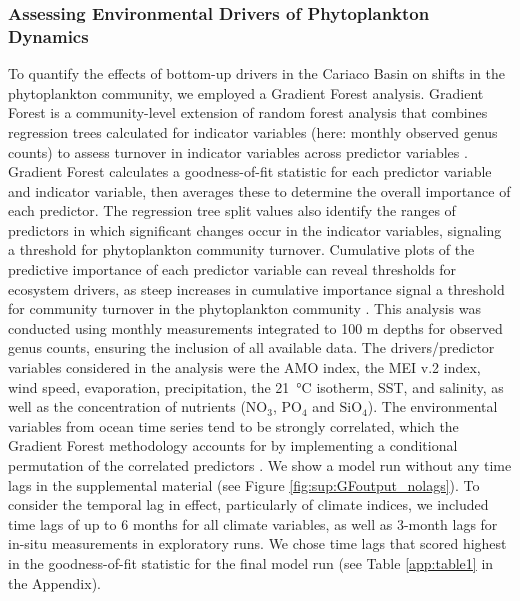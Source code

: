 \documentclass[draft]{agujournal2019}
\begin{document}
    \subsubsection{Assessing Environmental Drivers of Phytoplankton Dynamics}
    To quantify the effects of bottom-up drivers in the Cariaco Basin on shifts in the phytoplankton community, we employed a Gradient Forest analysis. Gradient Forest is a community-level extension of random forest analysis that combines regression trees calculated for indicator variables (here: monthly observed genus counts) to assess turnover in indicator variables across predictor variables \cite{pitcher_example_2012, large_critical_2015, tam_comparing_2017}. Gradient Forest calculates a goodness-of-fit statistic for each predictor variable and indicator variable, then averages these to determine the overall importance of each predictor. The regression tree split values also identify the ranges of predictors in which significant changes occur in the indicator variables, signaling a threshold for phytoplankton community turnover. Cumulative plots of the predictive importance of each predictor variable can reveal thresholds for ecosystem drivers, as steep increases in cumulative importance signal a threshold for community turnover in the phytoplankton community \cite{tam_comparing_2017}. This analysis was conducted using monthly measurements integrated to 100 m depths for observed genus counts, ensuring the inclusion of all available data. The drivers/predictor variables considered in the analysis were the AMO index, the MEI v.2 index, wind speed, evaporation, precipitation, the \qty{21}{\celsius} isotherm, SST, and salinity, as well as the concentration of nutrients ($\mathrm{NO}_3$, $\mathrm{PO}_4$ and $\mathrm{SiO}_4$). 
    The environmental variables from ocean time series tend to be strongly correlated, which the Gradient Forest methodology accounts for by implementing a conditional permutation of the correlated predictors \cite{ellis_gradient_2012}. 
    We show a model run without any time lags in the supplemental material (see Figure \ref{fig:sup:GFoutput_nolags}). To consider the temporal lag in effect, particularly of climate indices, we included time lags of up to 6 months for all climate variables, as well as 3-month lags for in-situ measurements in exploratory runs. We chose time lags that scored highest in the goodness-of-fit statistic for the final model run (see Table \ref{app:table1} in the Appendix). 
\end{document}
